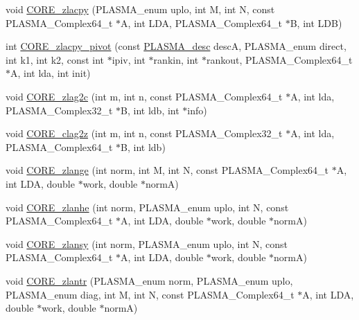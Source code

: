 \begin{DoxyCompactItemize}
\item 
void \hyperlink{group__CORE__PLASMA__Complex64__t_ga11c0d22cb3c26d416e734e89034b3ca8_ga11c0d22cb3c26d416e734e89034b3ca8}{C\+O\+R\+E\+\_\+zlacpy} (P\+L\+A\+S\+M\+A\+\_\+enum uplo, int M, int N, const P\+L\+A\+S\+M\+A\+\_\+\+Complex64\+\_\+t $\ast$A, int L\+D\+A, P\+L\+A\+S\+M\+A\+\_\+\+Complex64\+\_\+t $\ast$B, int L\+D\+B)
\item 
int \hyperlink{group__CORE__PLASMA__Complex64__t_gaca2f628466e876945145eb565f99446d_gaca2f628466e876945145eb565f99446d}{C\+O\+R\+E\+\_\+zlacpy\+\_\+pivot} (const \hyperlink{structplasma__desc__t}{P\+L\+A\+S\+M\+A\+\_\+desc} desc\+A, P\+L\+A\+S\+M\+A\+\_\+enum direct, int k1, int k2, const int $\ast$ipiv, int $\ast$rankin, int $\ast$rankout, P\+L\+A\+S\+M\+A\+\_\+\+Complex64\+\_\+t $\ast$A, int lda, int init)
\item 
void \hyperlink{group__CORE__PLASMA__Complex64__t_ga7888d57e44733e1c6ceeef29c0e0797a_ga7888d57e44733e1c6ceeef29c0e0797a}{C\+O\+R\+E\+\_\+zlag2c} (int m, int n, const P\+L\+A\+S\+M\+A\+\_\+\+Complex64\+\_\+t $\ast$A, int lda, P\+L\+A\+S\+M\+A\+\_\+\+Complex32\+\_\+t $\ast$B, int ldb, int $\ast$info)
\item 
void \hyperlink{group__CORE__PLASMA__Complex64__t_gac556c42319a0c08056711ca8550ae780_gac556c42319a0c08056711ca8550ae780}{C\+O\+R\+E\+\_\+clag2z} (int m, int n, const P\+L\+A\+S\+M\+A\+\_\+\+Complex32\+\_\+t $\ast$A, int lda, P\+L\+A\+S\+M\+A\+\_\+\+Complex64\+\_\+t $\ast$B, int ldb)
\item 
void \hyperlink{group__CORE__PLASMA__Complex64__t_gac2834f09cfda984ba04faa8bf888a832_gac2834f09cfda984ba04faa8bf888a832}{C\+O\+R\+E\+\_\+zlange} (int norm, int M, int N, const P\+L\+A\+S\+M\+A\+\_\+\+Complex64\+\_\+t $\ast$A, int L\+D\+A, double $\ast$work, double $\ast$norm\+A)
\item 
void \hyperlink{group__CORE__PLASMA__Complex64__t_ga5c5e37663da7f440d32801bc7cc91e03_ga5c5e37663da7f440d32801bc7cc91e03}{C\+O\+R\+E\+\_\+zlanhe} (int norm, P\+L\+A\+S\+M\+A\+\_\+enum uplo, int N, const P\+L\+A\+S\+M\+A\+\_\+\+Complex64\+\_\+t $\ast$A, int L\+D\+A, double $\ast$work, double $\ast$norm\+A)
\item 
void \hyperlink{group__CORE__PLASMA__Complex64__t_ga47506a177497b78fb7202189889d683f_ga47506a177497b78fb7202189889d683f}{C\+O\+R\+E\+\_\+zlansy} (int norm, P\+L\+A\+S\+M\+A\+\_\+enum uplo, int N, const P\+L\+A\+S\+M\+A\+\_\+\+Complex64\+\_\+t $\ast$A, int L\+D\+A, double $\ast$work, double $\ast$norm\+A)
\item 
void \hyperlink{group__CORE__PLASMA__Complex64__t_gae01bdbbb6378372169310951bb87e6b5_gae01bdbbb6378372169310951bb87e6b5}{C\+O\+R\+E\+\_\+zlantr} (P\+L\+A\+S\+M\+A\+\_\+enum norm, P\+L\+A\+S\+M\+A\+\_\+enum uplo, P\+L\+A\+S\+M\+A\+\_\+enum diag, int M, int N, const P\+L\+A\+S\+M\+A\+\_\+\+Complex64\+\_\+t $\ast$A, int L\+D\+A, double $\ast$work, double $\ast$norm\+A)

\end{DoxyCompactItemize}
